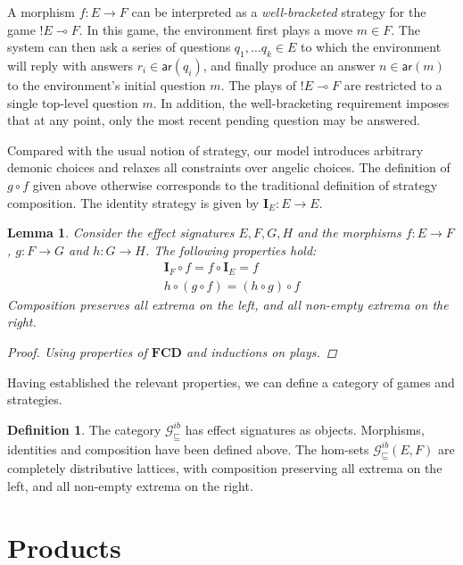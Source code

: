 \documentclass[11pt,oneside,draft]{book}
\newtheorem{lemma}[theorem]{Lemma}
\theoremstyle{definition}
\newtheorem{definition}[theorem]{Definition}
\newcommand{\gcat}{\mathcal{G}_{\sqsubseteq}}
\newcommand{\kw}[1]{\ensuremath{ \mathsf{#1} }}
\begin{document}
A morphism $f : E \rightarrow F$
can be interpreted as a \emph{well-bracketed} strategy for the game
${!E} \multimap F$.
In this game,
the environment first plays a move $m \in F$.
The system can then ask a series of questions
$q_1, \ldots q_k \in E$
to which the environment will reply with
answers $r_i \in \kw{ar}(q_i)$,
and finally produce an answer $n \in \kw{ar}(m)$
to the environment's initial question $m$.
The plays of ${!E} \multimap F$
are restricted to a single top-level question $m$.
In addition, the well-bracketing requirement
imposes that at any point,
only the most recent pending question
may be answered.

Compared with the usual notion of strategy,
our model introduces arbitrary demonic choices and
relaxes all constraints over angelic choices.
The definition of $g \circ f$ given above
otherwise corresponds to the traditional
definition of strategy composition.
The identity strategy is given by $\mathbf{I}_E : E \rightarrow E$.

\begin{lemma}
Consider the effect signatures $E, F, G, H$ and
the morphisms
$f : E \rightarrow F$,
$g : F \rightarrow G$ and
$h : G \rightarrow H$.
The following properties hold:
\begin{gather*}
  \mathbf{I}_F \circ f = f \circ \mathbf{I}_E = f \\
  h \circ (g \circ f) = (h \circ g) \circ f
\end{gather*}
Composition preserves all extrema on the left,
and all non-empty extrema on the right.
\begin{proof}
Using properties of $\mathbf{FCD}$
and inductions on plays.
\end{proof}
\end{lemma}

Having established the relevant properties,
we can define a category of games and strategies.

\begin{definition}
The category $\gcat^{ib}$ has effect signatures as objects.
Morphisms, identities and composition have been defined above.
The hom-sets $\gcat^{ib}(E, F)$
are completely distributive lattices,
with composition preserving all extrema on the left,
and all non-empty extrema on the right.
\end{definition}


\section{Products} %
\end{document}
